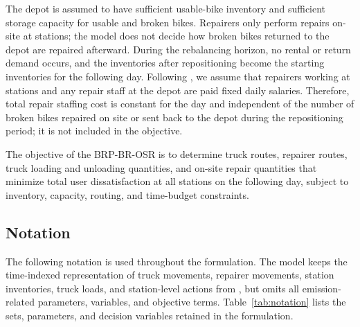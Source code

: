 The depot is assumed to have sufficient usable-bike inventory and sufficient
storage capacity for usable and broken bikes. Repairers only perform repairs
on-site at stations; the model does not decide how broken bikes returned to the
depot are repaired afterward. During the rebalancing horizon, no rental or return
demand occurs, and the inventories after repositioning become the starting
inventories for the following day. Following
\citet{huRepositioningBikeSharing2025}, we assume that repairers working at
stations and any repair staff at the depot are paid fixed daily salaries.
Therefore, total repair staffing cost is constant for the day and independent of
the number of broken bikes repaired on site or sent back to the depot during the
repositioning period; it is not included in the objective.

The objective of the BRP-BR-OSR is to determine truck routes, repairer routes,
truck loading and unloading quantities, and on-site repair quantities that
minimize total user dissatisfaction at all stations on the following day, subject
to inventory, capacity, routing, and time-budget constraints.

\subsection{Notation}\label{sec:notation}

The following notation is used throughout the formulation. The model keeps the
time-indexed representation of truck movements, repairer movements, station
inventories, truck loads, and station-level actions from
\citet{huRepositioningBikeSharing2025}, but omits all emission-related
parameters, variables, and objective terms. Table~\ref{tab:notation} lists the
sets, parameters, and decision variables retained in the formulation.

